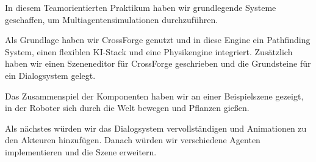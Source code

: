 In diesem Teamorientierten Praktikum haben wir grundlegende Systeme geschaffen, um Multiagentensimulationen durchzuführen. 

Als Grundlage haben wir CrossForge genutzt und in diese Engine ein Pathfinding System, einen flexiblen KI-Stack und eine Physikengine integriert. Zusätzlich haben wir einen Szeneneditor für CrossForge geschrieben und die Grundsteine für ein Dialogsystem gelegt.

Das Zusammenspiel der Komponenten haben wir an einer Beispielszene gezeigt, in der Roboter sich durch die Welt bewegen und Pflanzen gießen.


Als nächstes würden wir das Dialogsystem vervollständigen und Animationen zu den Akteuren hinzufügen. Danach würden wir verschiedene Agenten implementieren und die Szene erweitern.